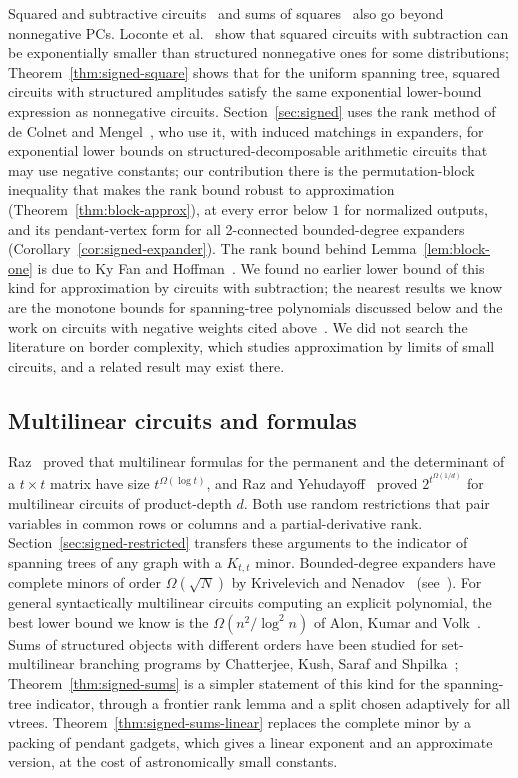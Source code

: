 Squared and subtractive circuits~\cite{LoconteEtAl24,WangVdB25} and sums of squares~\cite{LoconteMengelVergari25} also go beyond nonnegative PCs. Loconte et al.~\cite{LoconteEtAl24} show that squared circuits with subtraction can be exponentially smaller than structured nonnegative ones for some distributions; Theorem~\ref{thm:signed-square} shows that for the uniform spanning tree, squared circuits with structured amplitudes satisfy the same exponential lower-bound expression as nonnegative circuits. Section~\ref{sec:signed} uses the rank method of de Colnet and Mengel~\cite{DeColnetMengel21}, who use it, with induced matchings in expanders, for exponential lower bounds on structured-decomposable arithmetic circuits that may use negative constants; our contribution there is the permutation-block inequality that makes the rank bound robust to approximation (Theorem~\ref{thm:block-approx}), at every error below $1$ for normalized outputs, and its pendant-vertex form for all 2-connected bounded-degree expanders (Corollary~\ref{cor:signed-expander}). The rank bound behind Lemma~\ref{lem:block-one} is due to Ky Fan and Hoffman~\cite{FanHoffman53}. We found no earlier lower bound of this kind for approximation by circuits with subtraction; the nearest results we know are the monotone bounds for spanning-tree polynomials discussed below and the work on circuits with negative weights cited above~\cite{AgarwalBlaser24,BroadrickZhangVdB24}. We did not search the literature on border complexity, which studies approximation by limits of small circuits, and a related result may exist there.

\subsection{Multilinear circuits and formulas}

Raz~\cite{Raz09} proved that multilinear formulas for the permanent and the determinant of a $t\times t$ matrix have size $t^{\Omega(\log t)}$, and Raz and Yehudayoff~\cite{RazYehudayoff09} proved $2^{t^{\Omega(1/d)}}$ for multilinear circuits of product-depth $d$. Both use random restrictions that pair variables in common rows or columns and a partial-derivative rank. Section~\ref{sec:signed-restricted} transfers these arguments to the indicator of spanning trees of any graph with a $K_{t,t}$ minor. Bounded-degree expanders have complete minors of order $\Omega(\sqrt N)$ by Krivelevich and Nenadov~\cite{KrivelevichNenadov21} (see~\cite[Section~8]{Krivelevich19}). For general syntactically multilinear circuits computing an explicit polynomial, the best lower bound we know is the $\Omega(n^2/\log^2n)$ of Alon, Kumar and Volk~\cite{AlonKumarVolk18}. Sums of structured objects with different orders have been studied for set-multilinear branching programs by Chatterjee, Kush, Saraf and Shpilka~\cite{ChatterjeeKushSarafShpilka24}; Theorem~\ref{thm:signed-sums} is a simpler statement of this kind for the spanning-tree indicator, through a frontier rank lemma and a split chosen adaptively for all vtrees. Theorem~\ref{thm:signed-sums-linear} replaces the complete minor by a packing of pendant gadgets, which gives a linear exponent and an approximate version, at the cost of astronomically small constants.

